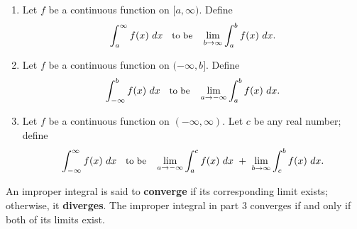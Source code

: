 {\begin{enumerate}
\item		Let $f$ be a continuous function on $[a,\infty)$. Define 
$$\small\int_a^\infty f(x)\ dx \quad \text{to be}\quad \lim_{b\to\infty}\int_a^b f(x)\ dx.$$

\item		Let $f$ be a continuous function on $(-\infty,b]$. Define
$$\small\int_{-\infty}^b f(x)\ dx \quad \text{to be}\quad \lim_{a\to-\infty}\int_a^b f(x)\ dx.$$

\item		Let $f$ be a continuous function on $(-\infty,\infty)$. Let $c$ be any real number; define
$$\small\int_{-\infty}^\infty f(x)\ dx \quad \text{to be}\quad \lim_{a\to-\infty}\int_a^c f(x)\ dx\ +\ \lim_{b\to\infty}\int_c^b f(x)\ dx.$$
\end{enumerate}
An improper integral is said to \textbf{converge} if its corresponding limit exists; otherwise, it \textbf{diverges}. The improper integral in part 3 converges if and only if both of its limits exist.
}
\enlargethispage{2\baselineskip}

